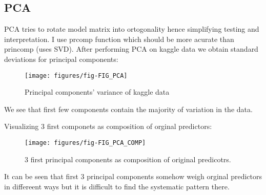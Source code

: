 \documentclass[a4paper]{article}
\begin{document}
\subsection{PCA}
PCA tries to rotate model matrix into ortogonality hence simplifying testing and
interpretation. I use prcomp function which should be more acurate than
princomp (uses SVD).
After performing PCA on kaggle data we obtain standard
deviations for principal components:
\begin{figure}[H]
\begin{center}
\texttt{[image: figures/fig-FIG\_PCA]}
\caption{Principal components' variance of kaggle data}
\end{center}
\end{figure}
We see that first few components contain the majority of variation in the data.

Visualizing 3 first componets as composition of orginal predictors:
\begin{figure}[H]
\begin{center}
\texttt{[image: figures/fig-FIG\_PCA\_COMP]}
\caption{3 first principal components as composition of original predicotrs.}
\end{center}
\end{figure}
It can be seen that first 3 principal components somehow weigh orginal
predictors in differeent ways but it is difficult to find the systematic pattern
there. 
\end{document}
